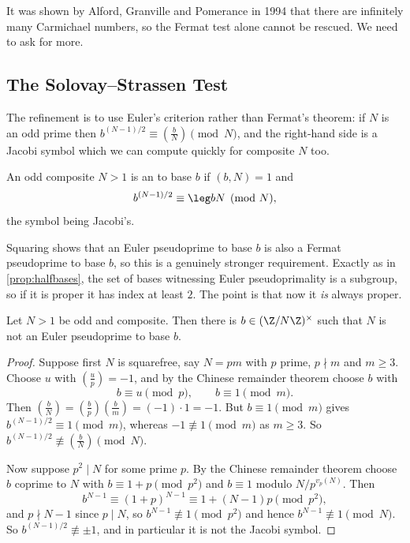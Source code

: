 It was shown by Alford, Granville and Pomerance in 1994 that there are infinitely many Carmichael numbers, so the Fermat test alone cannot be rescued. We need to ask for more.

\subsection{The Solovay--Strassen Test}

The refinement is to use Euler's criterion rather than Fermat's theorem: if $N$ is an odd prime then $b^{(N-1)/2} \equiv \left(\frac bN\right) \pmod N$, and the right-hand side is a Jacobi symbol which we can compute quickly for composite $N$ too.

\begin{definition}
	An odd composite $N > 1$ is an  to base $b$ if $(b, N) = 1$ and
	$$
	b^{(N-1)/2} \equiv \leg bN \pmod N,
	$$
	the symbol being Jacobi's.
\end{definition}

Squaring shows that an Euler pseudoprime to base $b$ is also a Fermat pseudoprime to base $b$, so this is a genuinely stronger requirement. Exactly as in \autoref{prop:halfbases}, the set of bases witnessing Euler pseudoprimality is a subgroup, so if it is proper it has index at least $2$. The point is that now it \emph{is} always proper.

\begin{theorem}\label{thm:eulerwitness}
	Let $N > 1$ be odd and composite. Then there is $b \in (\Z/N\Z)^\times$ such that $N$ is not an Euler pseudoprime to base $b$.
\end{theorem}
\begin{proof}
	Suppose first $N$ is squarefree, say $N = pm$ with $p$ prime, $p \nmid m$ and $m \geq 3$. Choose $u$ with $\left(\frac up\right) = -1$, and by the Chinese remainder theorem choose $b$ with
	$$
	b \equiv u \pmod p, \qquad b \equiv 1 \pmod m.
	$$
	Then $\left(\frac bN\right) = \left(\frac bp\right)\left(\frac bm\right) = (-1)\cdot 1 = -1$. But $b \equiv 1 \pmod m$ gives $b^{(N-1)/2}\equiv 1 \pmod m$, whereas $-1 \not\equiv 1 \pmod m$ as $m \geq 3$. So $b^{(N-1)/2}\not\equiv\left(\frac bN\right) \pmod N$.

	Now suppose $p^2 \mid N$ for some prime $p$. By the Chinese remainder theorem choose $b$ coprime to $N$ with $b \equiv 1 + p \pmod{p^2}$ and $b \equiv 1$ modulo $N/p^{v_p(N)}$. Then
	$$
	b^{N-1} \equiv (1+p)^{N-1}\equiv 1 + (N-1)p \pmod{p^2},
	$$
	and $p \nmid N - 1$ since $p \mid N$, so $b^{N-1}\not\equiv1\pmod{p^2}$ and hence $b^{N-1}\not\equiv1\pmod N$. So $b^{(N-1)/2}\not\equiv\pm1$, and in particular it is not the Jacobi symbol.
\end{proof}

